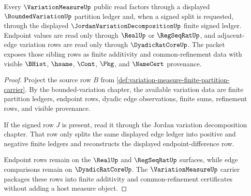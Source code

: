 \begin{theorem}
\label{thm:variation-measure-bounded-variation-dependency-route}
Every $\VariationMeasureUp$ public read factors through a displayed $\BoundedVariationUp$ partition ledger and, when a signed split is requested, through the displayed $\JordanVariationDecompositionUp$ finite signed ledger. Endpoint values are read only through $\RealUp$ or $\RegSeqRatUp$, and adjacent-edge variation rows are read only through $\DyadicRatCoreUp$. The packet exposes those sibling rows as finite additivity and common-refinement data with visible $\BHist$, $\hsame$, $\Cont$, $\Pkg$, and $\NameCert$ provenance.
\end{theorem}
\begin{proof}
Project the source row $B$ from \autoref{def:variation-measure-finite-partition-carrier}. By the bounded-variation chapter, the available variation data are finite partition ledgers, endpoint rows, dyadic edge observations, finite sums, refinement rows, and visible provenance.

If the signed row $J$ is present, read it through the Jordan variation decomposition chapter. That row only splits the same displayed edge ledger into positive and negative finite ledgers and reconstructs the displayed endpoint-difference row.

Endpoint rows remain on the $\RealUp$ and $\RegSeqRatUp$ surfaces, while edge comparisons remain on $\DyadicRatCoreUp$. The $\VariationMeasureUp$ carrier packages these rows into finite additivity and common-refinement certificates without adding a host measure object.
\end{proof}


\begin{closurestatus}{\VariationMeasureUp}
  \theoryclosure{\seedClosure}
  \formalstatus{\unformalizedV}
\end{closurestatus}

